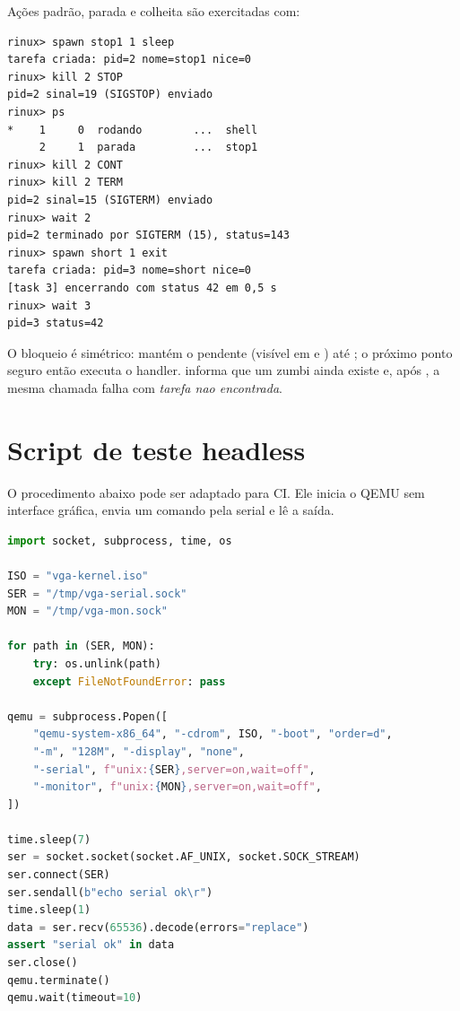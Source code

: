 A\c{c}\~oes padr\~ao, parada e colheita s\~ao exercitadas com:

\begin{lstlisting}[style=shell,caption={A\c{c}\~oes padr\~ao, SIGSTOP/SIGCONT e wait.},label={lst:testlifecyclept}]
rinux> spawn stop1 1 sleep
tarefa criada: pid=2 nome=stop1 nice=0
rinux> kill 2 STOP
pid=2 sinal=19 (SIGSTOP) enviado
rinux> ps
*    1     0  rodando        ...  shell
     2     1  parada         ...  stop1
rinux> kill 2 CONT
rinux> kill 2 TERM
pid=2 sinal=15 (SIGTERM) enviado
rinux> wait 2
pid=2 terminado por SIGTERM (15), status=143
rinux> spawn short 1 exit
tarefa criada: pid=3 nome=short nice=0
[task 3] encerrando com status 42 em 0,5 s
rinux> wait 3
pid=3 status=42
\end{lstlisting}

O bloqueio \'e sim\'etrico:  mant\'em o
 pendente (vis\'ivel em  e
) at\'e ; o pr\'oximo ponto
seguro ent\~ao executa o handler.  informa que um zumbi
ainda existe e, ap\'os , a mesma chamada falha com
\emph{tarefa nao encontrada}.

\section{Script de teste headless}

O procedimento abaixo pode ser adaptado para CI. Ele inicia o QEMU sem
interface gr\'afica, envia um comando pela serial e l\^e a sa\'ida.

\begin{lstlisting}[language=Python,caption={Esqueleto de teste headless com socket serial.},label={lst:testscript}]
import socket, subprocess, time, os

ISO = "vga-kernel.iso"
SER = "/tmp/vga-serial.sock"
MON = "/tmp/vga-mon.sock"

for path in (SER, MON):
    try: os.unlink(path)
    except FileNotFoundError: pass

qemu = subprocess.Popen([
    "qemu-system-x86_64", "-cdrom", ISO, "-boot", "order=d",
    "-m", "128M", "-display", "none",
    "-serial", f"unix:{SER},server=on,wait=off",
    "-monitor", f"unix:{MON},server=on,wait=off",
])

time.sleep(7)
ser = socket.socket(socket.AF_UNIX, socket.SOCK_STREAM)
ser.connect(SER)
ser.sendall(b"echo serial ok\r")
time.sleep(1)
data = ser.recv(65536).decode(errors="replace")
assert "serial ok" in data
ser.close()
qemu.terminate()
qemu.wait(timeout=10)
\end{lstlisting}


